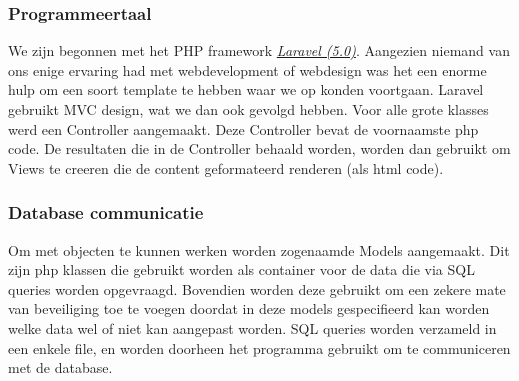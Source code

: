 \subsubsection{Programmeertaal}
We zijn begonnen met het PHP framework \href{http://laravel.com/}{\emph{Laravel (5.0)}}.
Aangezien niemand van ons enige ervaring had met webdevelopment of webdesign was het een
enorme hulp om een soort template te hebben waar we op konden voortgaan. Laravel gebruikt
MVC design, wat we dan ook gevolgd hebben. Voor alle grote klasses werd een Controller aangemaakt.
Deze Controller bevat de voornaamste php code. De resultaten die in de Controller behaald worden,
worden dan gebruikt om Views te creeren die de content geformateerd renderen (als html code).

\subsubsection{Database communicatie}
Om met objecten te kunnen werken worden zogenaamde Models aangemaakt. Dit zijn php klassen die
gebruikt worden als container voor de data die via SQL queries worden opgevraagd.
Bovendien worden deze gebruikt om een zekere mate van beveiliging toe te voegen doordat
in deze models gespecifieerd kan worden welke data wel of niet kan aangepast worden. SQL queries
worden verzameld in een enkele file, en worden doorheen het programma gebruikt om te communiceren
met de database.


